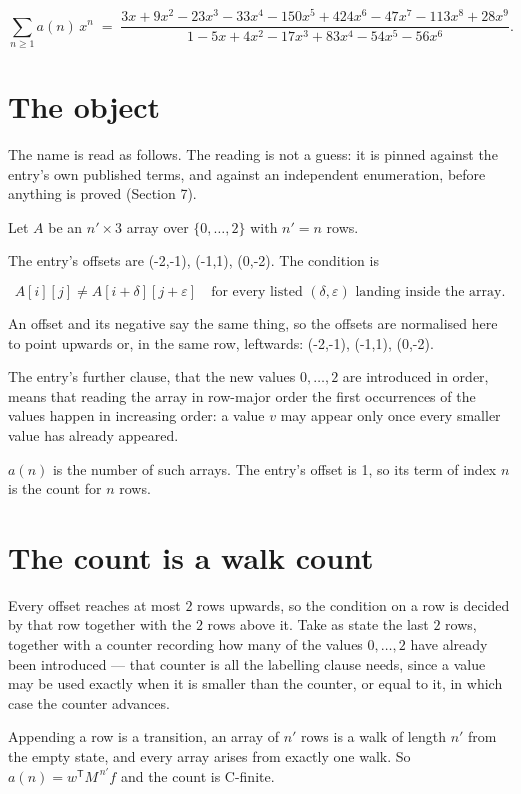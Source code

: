 \documentclass[11pt]{article}
\theoremstyle{definition}
\begin{document}
\[\sum_{n \ge 1} a(n)\,x^n \;=\; \frac{3x + 9x^{2} - 23x^{3} - 33x^{4} - 150x^{5} + 424x^{6} - 47x^{7} - 113x^{8} + 28x^{9}}{1 - 5x + 4x^{2} - 17x^{3} + 83x^{4} - 54x^{5} - 56x^{6}}.\]

\section{The object}

The name is read as follows. The reading is not a guess: it is pinned against the entry's own published terms, and against an independent enumeration, before anything is proved (Section 7).

Let $A$ be an $n' \times 3$ array over $\{0,\dots,2\}$ with $n' = n$ rows.

The entry's offsets are (-2,-1), (-1,1), (0,-2). The condition is

\[A[i][j] \ne A[i{+}\delta][j{+}\varepsilon]\quad\text{for every listed }(\delta,\varepsilon)\text{ landing inside the array.}\]

An offset and its negative say the same thing, so the offsets are normalised here to point upwards or, in the same row, leftwards: (-2,-1), (-1,1), (0,-2).

The entry's further clause, that the new values $0,\dots,2$ are introduced in order, means that reading the array in row-major order the first occurrences of the values happen in increasing order: a value $v$ may appear only once every smaller value has already appeared.

$a(n)$ is the number of such arrays. The entry's offset is 1, so its term of index $n$ is the count for $n$ rows.

\section{The count is a walk count}

Every offset reaches at most $2$ rows upwards, so the condition on a row is decided by that row together with the $2$ rows above it. Take as state the last $2$ rows, together with a counter recording how many of the values $0,\dots,2$ have already been introduced --- that counter is all the labelling clause needs, since a value may be used exactly when it is smaller than the counter, or equal to it, in which case the counter advances.

Appending a row is a transition, an array of $n'$ rows is a walk of length $n'$ from the empty state, and every array arises from exactly one walk. So $a(n) = w^{\mathsf T}M^{\,n'}f$ and the count is C-finite.
\end{document}
